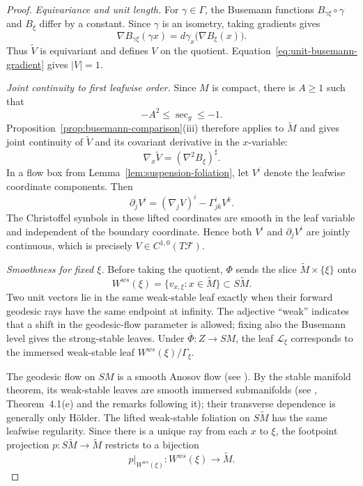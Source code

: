 \documentclass[12pt]{amsart}
\theoremstyle{definition}
\numberwithin{equation}{section}
\newcommand{\mc}{\mathcal}
\newcommand{\wti}{\widetilde}
\begin{document}
\begin{proof}
\emph{Equivariance and unit length.}
For \(\gamma\in\Gamma\), the Busemann functions
\(B_{\gamma\xi}\circ\gamma\) and \(B_\xi\) differ by a constant.  Since
\(\gamma\) is an isometry, taking gradients gives
\[
  \nabla B_{\gamma\xi}(\gamma x)
  =d\gamma_x\bigl(\nabla B_\xi(x)\bigr).
\]
Thus \(\widetilde V\) is equivariant and defines \(V\) on the quotient.
Equation~\eqref{eq:unit-busemann-gradient} gives \(|V|=1\).

\smallskip
\noindent\emph{Joint continuity to first leafwise order.}
Since \(M\) is compact, there is \(A\geq1\) such that
\[
  -A^2\leq\sec_g\leq-1.
\]
Proposition~\ref{prop:busemann-comparison}\textup{(iii)} therefore
applies to \(\wti M\) and gives joint continuity of \(\widetilde V\)
and its covariant derivative in the \(x\)-variable:
\[
  \nabla_x\widetilde V=(\nabla^2B_\xi)^\sharp.
\]
In a flow box from Lemma~\ref{lem:suspension-foliation}, let \(V^i\)
denote the leafwise coordinate components.  Then
\[
  \partial_jV^i
  =
  (\nabla_jV)^i-\Gamma^i_{jk}V^k.
\]
The Christoffel symbols in these lifted coordinates are smooth in the
leaf variable and independent of the boundary coordinate.  Hence both
\(V^i\) and \(\partial_jV^i\) are jointly continuous, which is precisely
\(V\in C^{1,0}(T\mc F)\).

\smallskip
\noindent\emph{Smoothness for fixed \(\xi\).}
Before taking the quotient, \(\Phi\) sends the slice
\(\wti M\times\{\xi\}\) onto
\[
  W^{ws}(\xi)
  =
  \{v_{x,\xi}:x\in\wti M\}
  \subset S\wti M.
\]
Two unit vectors lie in the same weak-stable leaf exactly when their
forward geodesic rays have the same endpoint at infinity.  The adjective
``weak'' indicates that a shift in the geodesic-flow parameter is
allowed; fixing also the Busemann level gives the strong-stable leaves.
Under \(\overline\Phi\colon Z\to SM\), the leaf \(\mc L_\xi\)
corresponds to the immersed weak-stable leaf
\(W^{ws}(\xi)/\Gamma_\xi\).

The geodesic flow on \(SM\) is a smooth Anosov flow
(see \cite{Anosov1967}).  By the stable manifold theorem, its weak-stable
leaves are smooth immersed submanifolds (see
\cite{HirschPughShub1977}, Theorem~4.1\textup{(e)} and the remarks
following it); their transverse dependence is generally only H\"older.
The lifted weak-stable foliation on \(S\wti M\) has the same leafwise
regularity.  Since there is a unique ray from each \(x\) to \(\xi\), the
footpoint projection
\(p\colon S\wti M\to\wti M\) restricts to a bijection
\[
  p|_{W^{ws}(\xi)}\colon W^{ws}(\xi)\longrightarrow\wti M.
\]


\end{proof}
\end{document}
